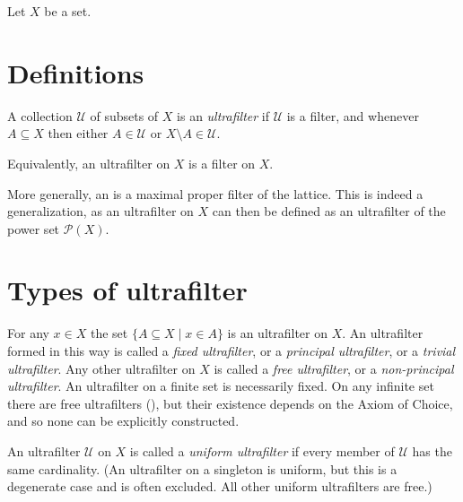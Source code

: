 \documentclass[12pt]{article}
\begin{document}

Let $X$ be a set.

\section*{Definitions}

A collection $\mathcal{U}$ of subsets of $X$ is an \emph{ultrafilter} if $\mathcal{U}$ is a filter, and whenever $A\subseteq X$ then either $A\in\mathcal{U}$ or $X\setminus A\in\mathcal{U}$.

Equivalently, an ultrafilter on $X$ is a  filter on $X$.

More generally, an 
is a maximal proper filter of the lattice.
This is indeed a generalization, as an ultrafilter on $X$
can then be defined as an ultrafilter of the power set $\mathcal{P}(X)$.

\section*{Types of ultrafilter}

For any $x\in X$ the set $\{A\subseteq X\mid x\in A\}$ is an ultrafilter on $X$.
An ultrafilter formed in this way is called a \emph{fixed ultrafilter},
or a \emph{principal ultrafilter}, or a \emph{trivial ultrafilter}.
Any other ultrafilter on $X$ is called a \emph{free ultrafilter},
or a \emph{non-principal ultrafilter}.
An ultrafilter on a finite set is necessarily fixed.
On any infinite set there are free ultrafilters
(),
but their existence depends on the Axiom of Choice,
and so none can be explicitly constructed.

An ultrafilter $\mathcal{U}$ on $X$ is called a \emph{uniform ultrafilter}
if every member of $\mathcal{U}$ has the same cardinality.
(An ultrafilter on a singleton is uniform,
but this is a degenerate case and is often excluded.
All other uniform ultrafilters are free.)
\end{document}
